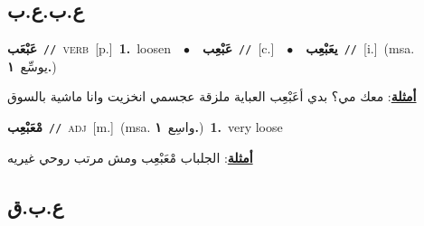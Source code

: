 \documentclass[10pt,a4paper,twoside]{article} %
\begin{document}
\begin{multicols}{2}
\vspace{-3mm}
\subsection*{\color{blue}\foreignlanguage{arabic}{ع.ب.ع.ب}\color{blue}{}} 

{\setlength\topsep{0pt}\textbf{\foreignlanguage{arabic}{عَبْعَب}}\ {\color{gray}\texttt{//}\color{black}}\ \textsc{verb}\ [p.]\ \textbf{1.}~loosen\ \ $\bullet$\ \ \setlength\topsep{0pt}\textbf{\foreignlanguage{arabic}{عَبْعِب}}\ {\color{gray}\texttt{//}\color{black}}\ [c.]\ \ $\bullet$\ \ \setlength\topsep{0pt}\textbf{\foreignlanguage{arabic}{يعَبْعِب}}\ {\color{gray}\texttt{//}\color{black}}\ [i.]\ \color{gray}(msa. \foreignlanguage{arabic}{يوسِّع}~\foreignlanguage{arabic}{\textbf{١.}})\color{black}\  \begin{flushright}\color{gray}\foreignlanguage{arabic}{\textbf{\underline{\foreignlanguage{arabic}{أمثلة}}}: معك مي؟ بدي أعَبْعِب العباية ملزقة عجسمي انخزيت وانا ماشية بالسوق}\end{flushright}\color{black}} \vspace{2mm}

{\setlength\topsep{0pt}\textbf{\foreignlanguage{arabic}{مْعَبْعِب}}\ {\color{gray}\texttt{//}\color{black}}\ \textsc{adj}\ [m.]\ \color{gray}(msa. \foreignlanguage{arabic}{واسِع}~\foreignlanguage{arabic}{\textbf{١.}})\color{black}\ \textbf{1.}~very loose\  \begin{flushright}\color{gray}\foreignlanguage{arabic}{\textbf{\underline{\foreignlanguage{arabic}{أمثلة}}}: الجلباب مْعَبْعِب ومش مرتب روحي غيريه}\end{flushright}\color{black}} \vspace{2mm}

\vspace{-3mm}
\subsection*{\color{blue}\foreignlanguage{arabic}{ع.ب.ق}\color{blue}{}} 


\end{multicols}
\end{document}
